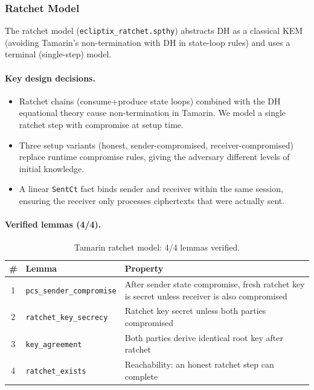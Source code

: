 \documentclass[11pt,a4paper]{article}
\theoremstyle{definition}
\begin{document}
\subsubsection{Ratchet Model}

The ratchet model (\texttt{ecliptix\_ratchet.spthy}) abstracts DH as a classical KEM (avoiding Tamarin's non-termination with DH in state-loop rules) and uses a terminal (single-step) model.

\paragraph{Key design decisions.}
\begin{itemize}
  \item Ratchet chains (consume+produce state loops) combined with the DH equational theory cause non-termination in Tamarin. We model a single ratchet step with compromise at setup time.
  \item Three setup variants (honest, sender-compromised, receiver-compromised) replace runtime compromise rules, giving the adversary different levels of initial knowledge.
  \item A linear \texttt{SentCt} fact binds sender and receiver within the same session, ensuring the receiver only processes ciphertexts that were actually sent.
\end{itemize}

\paragraph{Verified lemmas (4/4).}

\begin{table}[H]
\centering
\caption{Tamarin ratchet model: 4/4 lemmas verified.}\label{tab:tamarin-rt}
\small
\begin{tabularx}{\textwidth}{@{}clX@{}}
\toprule
\# & Lemma & Property \\
\midrule
1 & \texttt{pcs\_sender\_compromise} & After sender state compromise, fresh ratchet key is secret unless receiver is also compromised \\
2 & \texttt{ratchet\_key\_secrecy} & Ratchet key secret unless both parties compromised \\
3 & \texttt{key\_agreement} & Both parties derive identical root key after ratchet \\
4 & \texttt{ratchet\_exists} & Reachability: an honest ratchet step can complete \\
\bottomrule
\end{tabularx}
\end{table}
\end{document}
